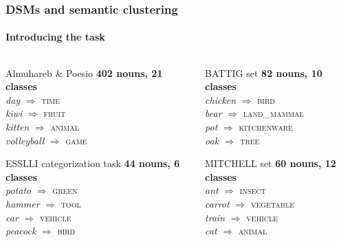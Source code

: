 \documentclass[t]{beamer} %
\begin{document}
\begin{frame}
  \frametitle{DSMs and semantic clustering}
  \framesubtitle{Introducing the task}

  \ungap[1.5]
  \begin{columns}
    \begin{column}{0.5 \textwidth}
      \begin{exampleblock}{Almuhareb \& Poesio}
        \textbf{402 nouns, 21 classes} \\
        \textit{day} $\Longrightarrow$ \textsc{time}   \\
        \textit{kiwi} $\Longrightarrow$ \textsc{fruit}  \\
        \textit{kitten} $\Longrightarrow$ \textsc{animal} \\
        \textit{volleyball} $\Longrightarrow$ \textsc{game}
      \end{exampleblock}
      \begin{exampleblock}{ESSLLI categorization task}
        \textbf{44 nouns, 6 classes} \\
        \textit{potato} $\Longrightarrow$ \textsc{green}  \\
        \textit{hammer} $\Longrightarrow$ \textsc{tool}  \\
        \textit{car} $\Longrightarrow$ \textsc{vehicle} \\
        \textit{peacock} $\Longrightarrow$ \textsc{bird}     
      \end{exampleblock}
    \end{column}
    \begin{column}{0.5 \textwidth}
      \begin{exampleblock}{BATTIG set}
        \textbf{82 nouns, 10 classes} \\
        \textit{chicken} $\Longrightarrow$ \textsc{bird}   \\
        \textit{bear} $\Longrightarrow$ \textsc{land\_mammal}  \\
        \textit{pot} $\Longrightarrow$ \textsc{kitchenware} \\
        \textit{oak} $\Longrightarrow$ \textsc{tree} 
      \end{exampleblock}
      \begin{exampleblock}{MITCHELL set}
        \textbf{60 nouns, 12 classes} \\
        \textit{ant} $\Longrightarrow$ \textsc{insect}   \\
        \textit{carrot} $\Longrightarrow$ \textsc{vegetable}  \\
        \textit{train} $\Longrightarrow$ \textsc{vehicle} \\
        \textit{cat} $\Longrightarrow$ \textsc{animal}
      \end{exampleblock}
    \end{column}
  \end{columns}
\end{frame}
\end{document}
